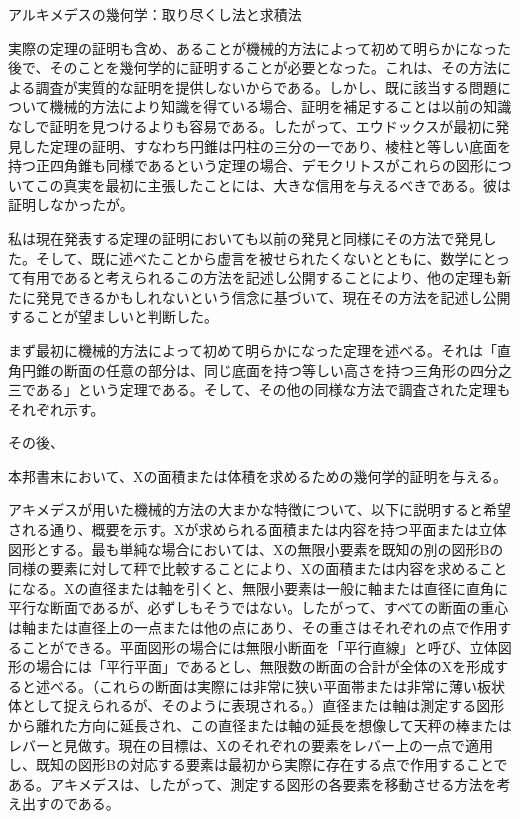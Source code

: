 \documentclass[a4paper,11pt,openany]{ltjsbook}
\begin{document}
アルキメデスの幾何学：取り尽くし法と求積法

実際の定理の証明も含め、あることが機械的方法によって初めて明らかになった後で、そのことを幾何学的に証明することが必要となった。これは、その方法による調査が実質的な証明を提供しないからである。しかし、既に該当する問題について機械的方法により知識を得ている場合、証明を補足することは以前の知識なしで証明を見つけるよりも容易である。したがって、エウドックスが最初に発見した定理の証明、すなわち円錐は円柱の三分の一であり、棱柱と等しい底面を持つ正四角錐も同様であるという定理の場合、デモクリトスがこれらの図形についてこの真実を最初に主張したことには、大きな信用を与えるべきである。彼は証明しなかったが。

私は現在発表する定理の証明においても以前の発見と同様にその方法で発見した。そして、既に述べたことから虚言を被せられたくないとともに、数学にとって有用であると考えられるこの方法を記述し公開することにより、他の定理も新たに発見できるかもしれないという信念に基づいて、現在その方法を記述し公開することが望ましいと判断した。

まず最初に機械的方法によって初めて明らかになった定理を述べる。それは「直角円錐の断面の任意の部分は、同じ底面を持つ等しい高さを持つ三角形の四分之三である」という定理である。そして、その他の同様な方法で調査された定理もそれぞれ示す。

その後、

本邦書末において、Xの面積または体積を求めるための幾何学的証明を与える。

アキメデスが用いた機械的方法の大まかな特徴について、以下に説明すると希望される通り、概要を示す。Xが求められる面積または内容を持つ平面または立体図形とする。最も単純な場合においては、Xの無限小要素を既知の別の図形Bの同様の要素に対して秤で比較することにより、Xの面積または内容を求めることになる。Xの直径または軸を引くと、無限小要素は一般に軸または直径に直角に平行な断面であるが、必ずしもそうではない。したがって、すべての断面の重心は軸または直径上の一点または他の点にあり、その重さはそれぞれの点で作用することができる。平面図形の場合には無限小断面を「平行直線」と呼び、立体図形の場合には「平行平面」であるとし、無限数の断面の合計が全体のXを形成すると述べる。（これらの断面は実際には非常に狭い平面帯または非常に薄い板状体として捉えられるが、そのように表現される。）直径または軸は測定する図形から離れた方向に延長され、この直径または軸の延長を想像して天秤の棒またはレバーと見做す。現在の目標は、Xのそれぞれの要素をレバー上の一点で適用し、既知の図形Bの対応する要素は最初から実際に存在する点で作用することである。アキメデスは、したがって、測定する図形の各要素を移動させる方法を考え出すのである。
\end{document}
